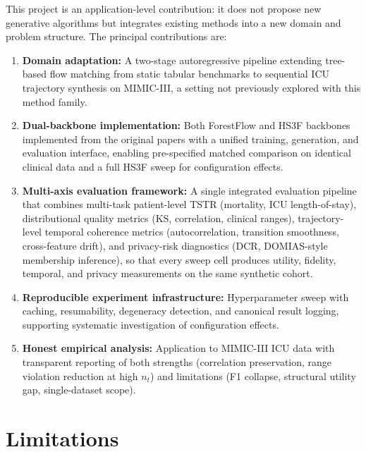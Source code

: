 This project is an application-level contribution: it does not propose new generative algorithms but integrates existing methods into a new domain and problem structure. The principal contributions are:
\begin{enumerate}\tightlist
    \item \textbf{Domain adaptation:} A two-stage autoregressive pipeline extending tree-based flow matching from static tabular benchmarks to sequential ICU trajectory synthesis on MIMIC-III, a setting not previously explored with this method family.
    \item \textbf{Dual-backbone implementation:} Both ForestFlow and HS3F backbones implemented from the original papers with a unified training, generation, and evaluation interface, enabling pre-specified matched comparison on identical clinical data and a full HS3F sweep for configuration effects.
    \item \textbf{Multi-axis evaluation framework:} A single integrated evaluation pipeline that combines multi-task patient-level TSTR (mortality, ICU length-of-stay), distributional quality metrics (KS, correlation, clinical ranges), trajectory-level temporal coherence metrics (autocorrelation, transition smoothness, cross-feature drift), and privacy-risk diagnostics (DCR, DOMIAS-style membership inference), so that every sweep cell produces utility, fidelity, temporal, and privacy measurements on the same synthetic cohort.
    \item \textbf{Reproducible experiment infrastructure:} Hyperparameter sweep with caching, resumability, degeneracy detection, and canonical result logging, supporting systematic investigation of configuration effects.
    \item \textbf{Honest empirical analysis:} Application to MIMIC-III ICU data with transparent reporting of both strengths (correlation preservation, range violation reduction at high $n_t$) and limitations (F1 collapse, structural utility gap, single-dataset scope).
\end{enumerate}

\section{Limitations}

